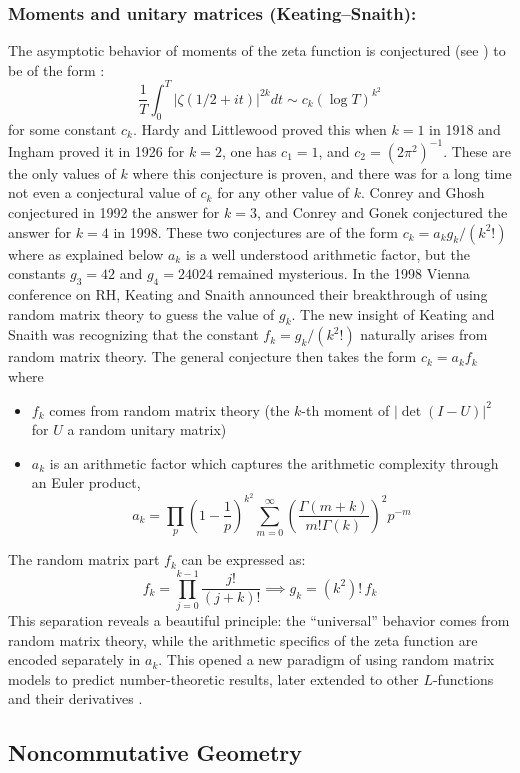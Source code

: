 \documentclass{article}
\begin{document}
\subsubsection{Moments and unitary matrices (Keating–Snaith):}
The asymptotic behavior of moments of the zeta function is conjectured (see \cite{Conrey84}) to be of the form :
\[
\frac 1T\int_0^T |\zeta(1/2 + it)|^{2k} dt \sim c_k (\log T)^{k^2}
\]
for some constant $c_k$.  Hardy and Littlewood proved this when $k=1$ in 1918 and Ingham proved it in 1926 \cite{Ingham2} for $k=2$, one has $c_1=1$, and $c_2=\left(2 \pi^2\right)^{-1}$.  These are the only values of $k$ where this conjecture is proven, and there was for a long time not even a conjectural value of $c_k$ for any other value of $k$. Conrey and Ghosh \cite{Conrey3} conjectured in 1992 the answer for $k=3$, and Conrey and Gonek \cite{Conrey4} conjectured the answer for $k=4$ in 1998. These two conjectures are of the form $c_k=a_k g_k/(k^2!)$ where as explained below $a_k$ is a well understood arithmetic factor, but the constants $g_3=42$ and $g_4=24024$ remained mysterious. In the 1998 Vienna conference on RH,  Keating and Snaith \cite{KeatingSnaith2000,KeatingSnaithMoments} announced their breakthrough of using random matrix theory to guess the value of $g_k$. The new insight of Keating and Snaith was recognizing that the constant $f_k=g_k/(k^2!)$ naturally arises from 
random matrix theory. The general conjecture then takes the form $c_k=a_kf_k$ where
\begin{itemize}
\item $f_k$ comes from random matrix theory (the $k$-th moment of $|\det(I - U)|^2$ for $U$ a random unitary matrix)
\item $a_k$ is an arithmetic factor which captures the arithmetic complexity through an Euler product, $$a_k=\prod_p\left(1-\frac{1}{p}\right)^{k^2} \sum_{m=0}^{\infty}\left(\frac{\Gamma(m+k)}{m!\Gamma(k)}\right)^2 p^{-m}$$
\end{itemize}
 The random matrix part $f_k$ can be expressed as:
\[
f_k = \prod_{j=0}^{k-1} \frac{j!}{(j+k)!}\implies g_k=(k^2)!\,f_k
\]
 This separation reveals
  a beautiful principle: the ``universal'' behavior comes from random matrix theory, while the arithmetic specifics of the zeta function are encoded separately in $a_k$. This opened a new paradigm of using random matrix models to predict number-theoretic results, later extended to other $L$-functions and their derivatives \cite{ConreySnaithRatios,GonekHughesKeatingHybrid,Snaith}.


\subsection{Noncommutative Geometry}
\end{document}

